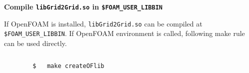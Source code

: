		\vspace{0.2cm}

		\textbf{Compile \texttt{libGrid2Grid.so} in \texttt{\$FOAM\_USER\_LIBBIN}}
		
		If OpenFOAM is installed, \texttt{libGrid2Grid.so} can be compiled at \texttt{\$FOAM\_USER\_LIBBIN}. If OpenFOAM environment is called, following make rule can be used directly. 
		
		\begin{lstlisting}[language=bash]
		
		$	make createOFlib
		\end{lstlisting}